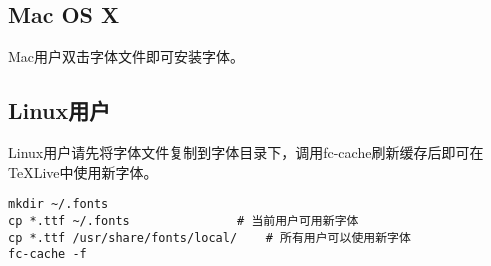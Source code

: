 \subsection{Mac OS X}

Mac用户双击字体文件即可安装字体。

\subsection{Linux用户}

Linux用户请先将字体文件复制到字体目录下，调用fc-cache刷新缓存后即可在TeXLive中使用新字体。

\begin{lstlisting}[basicstyle=\small\ttfamily, numbers=none]
mkdir ~/.fonts
cp *.ttf ~/.fonts				# 当前用户可用新字体
cp *.ttf /usr/share/fonts/local/	# 所有用户可以使用新字体
fc-cache -f
\end{lstlisting}

